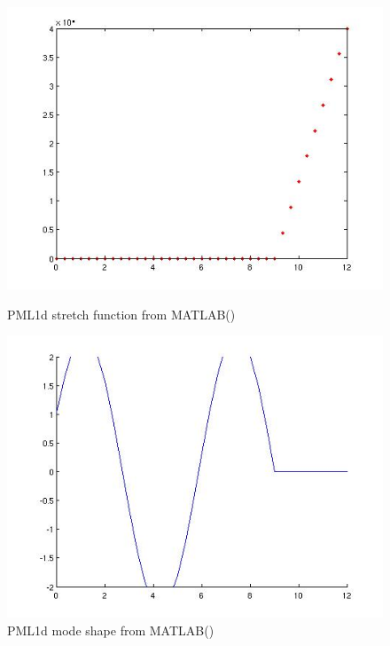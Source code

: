 \begin{figure}[htbp]
\begin{minipage}{0.45\linewidth}
    \includegraphics[width=\linewidth]{fig/pml1d_stretch4e6_matlab.jpg}
    \caption{PML1d stretch function from MATLAB()}
    \label{fig:PML1dStretchFunction4e6MATLAB}
  \end{minipage}
  \hfill
  \begin{minipage}{0.45\linewidth}
    \includegraphics[width=\linewidth]{fig/pml1d_mode4e6_matlab.jpg}
    \caption{PML1d mode shape from MATLAB()}
    \label{fig:PML1dModeShape4e6MATLAB}
  \end{minipage}
\end{figure}

\clearpage
